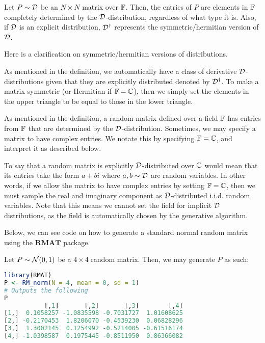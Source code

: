 \begin{definition}
Let $P \sim \mathcal{D}$ be an $N \times N$ matrix over $\mathbb{F}$. Then, the entries of $P$ are elements in $\mathbb{F}$ completely determined by the $\mathcal{D}$-distribution, regardless of what type it is.
Also, if $\mathcal{D}$ is an explicit distribution, $\mathcal{D}^\dagger$ represents the symmetric/hermitian version of $\mathcal{D}$.
\end{definition}

Here is a clarification on symmetric/hermitian versions of distributions.

\begin{remark}
As mentioned in the definition, we automatically have a class of derivative $\mathcal{D}$-distributions given that they are explicitly distributed denoted by $\mathcal{D}^\dagger$. To make a matrix symmetric
(or Hermitian if $\mathbb{F} = \mathbb{C}$), then we simply set the elements in the upper triangle to be equal to those in the lower triangle.
\end{remark}

As mentioned in the definition, a random matrix defined over a field $\mathbb{F}$ has entries from $\mathbb{F}$ that are determined by the $\mathcal{D}$-distribution.
Sometimes, we may specify a matrix to have complex entries. We notate this by specifying $\mathbb{F} = \mathbb{C}$, and interpret it as described below.

\begin{remark}
To say that a random matrix is explicitly $\mathcal{D}$-distributed over $\mathbb{C}$ would mean that its entries take the form $a + bi$ where $a,b \sim \mathcal{D}$ are random variables.
In other words, if we allow the matrix to have complex entries by setting $\mathbb{F} = \mathbb{C}$, then we must sample the real and imaginary component as $\mathcal{D}$-distributed i.i.d. random variables.
Note that this means we cannot set the field for implicit $\mathcal{D}$ distributions, as the field is automatically chosen by the generative algorithm.
\end{remark}

\medskip
 Below, we can see code on how to generate a standard normal random matrix using the $\textbf{RMAT}$ package.
\begin{code}
Let $P \sim \mathcal{N}(0,1)$ be a $4 \times 4$ random matrix. Then, we may generate $P$ as such:
\end{code}

\begin{lstlisting}[language=R]
library(RMAT)
P <- RM_norm(N = 4, mean = 0, sd = 1)
# Outputs the following
P
           [,1]       [,2]       [,3]        [,4]
[1,]  0.1058257 -1.0835598 -0.7031727  1.01608625
[2,] -0.2170453  1.8206070 -0.4539230  0.06828296
[3,]  1.3002145  0.1254992 -0.5214005 -0.61516174
[4,] -1.0398587  0.1975445 -0.8511950  0.86366082
\end{lstlisting}


